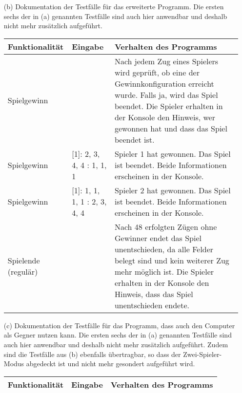 \documentclass[a4paper]{article}
\begin{document}
\begin{exercise}{2}
\begin{itemize}
\item[(b)] Dokumentation der Testf\"alle f\"ur das erweiterte Programm. Die ersten sechs der in (a) genannten Testf\"alle sind auch hier anwendbar und deshalb nicht mehr zus\"atzlich aufgef\"uhrt.

\begin{center}
	\begin{tabular}{| p{2.5cm} | p{2.2cm} | p{10cm} |}
		\hline
		Funktionalit\"at & Eingabe & Verhalten des Programms\\ \hline \hline
		
		Spielgewinn &
		& Nach jedem Zug eines Spielers wird gepr\"uft, ob eine der Gewinnkonfiguration erreicht wurde. Falls ja, wird das
		Spiel beendet. Die Spieler erhalten in der Konsole den Hinweis, wer gewonnen hat und dass das Spiel beendet
		ist. \\ \hline
		
		Spielgewinn & [1]: 2, 3, 4, 4 \newline [2]: 1, 1, 1 &
		Spieler 1 hat gewonnen. Das Spiel ist beendet. Beide Informationen erscheinen in der Konsole. \\ \hline
		
		Spielgewinn & [1]: 1, 1, 1, 1 \newline [2]: 2, 3, 4, 4 &
		Spieler 2 hat gewonnen. Das Spiel ist beendet. Beide Informationen erscheinen in der Konsole. \\ \hline
		
		Spielende \newline (regul\"ar) &
		& Nach 48 erfolgten Z\"ugen ohne Gewinner endet das Spiel unentschieden, da alle Felder belegt sind und kein
		weiterer Zug mehr m\"oglich ist. Die Spieler erhalten in der Konsole den Hinweis, dass das Spiel unentschieden
		endete. \\ \hline
	\end{tabular}
\end{center}

\newpage

\item[(c)] Dokumentation der Testf\"alle f\"ur das Programm, dass auch den Computer als Gegner nutzen kann.
Die ersten sechs der in (a) genannten Testf\"alle sind auch hier anwendbar und deshalb nicht mehr zus\"atzlich aufgef\"uhrt. Zudem sind die Testf\"alle aus (b) ebenfalls \"ubertragbar, so dass der Zwei-Spieler-Modus abgedeckt ist und nicht mehr gesondert aufgef\"uhrt wird.

\begin{center}
	\begin{tabular}{| p{2.5cm} | p{2.2cm} | p{10cm} |}
		\hline
		Funktionalit\"at & Eingabe & Verhalten des Programms\\ \hline \hline
		

\end{tabular}
\end{center}
\end{itemize}
\end{exercise}
\end{document}
